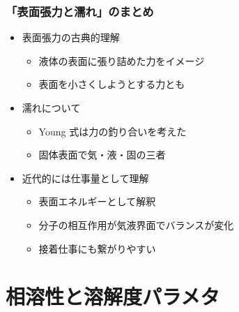 \documentclass[unicode,12pt]{beamer}%
\begin{document}
\begin{frame}
	\frametitle{「表面張力と濡れ」のまとめ}
        \begin{boxnote}
            \vspace{-3mm}
            \begin{itemize}
                \item 表面張力の古典的理解
                    \begin{itemize}
                        \item 液体の表面に張り詰めた力をイメージ
						\item 表面を小さくしようとする力とも
                    \end{itemize} 
                \item 濡れについて
                    \begin{itemize}
                        \item Young 式は力の釣り合いを考えた
                        \item 固体表面で気・液・固の三者
                    \end{itemize} 
                \item 近代的には仕事量として理解
                    \begin{itemize}
                        \item 表面エネルギーとして解釈
                        \item 分子の相互作用が気液界面でバランスが変化
                        \item 接着仕事にも繋がりやすい
                    \end{itemize}
            \end{itemize}
        \end{boxnote}
\end{frame}

\section{相溶性と溶解度パラメタ}
\end{document}
